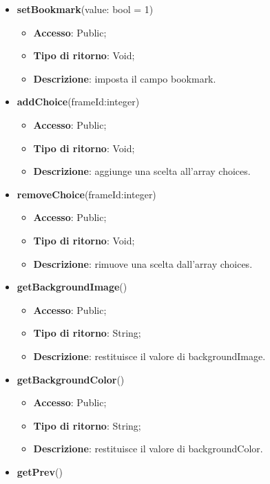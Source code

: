 {{\begin{itemize}
\begin{itemize}
				\item \textbf{Tipo di ritorno}: Bool;
				\item \textbf{Descrizione}: ritorna il valore del campo bookmark.
			\end{itemize}
			\item \textbf{setBookmark}(value: bool = 1)
			\begin{itemize}
				\item \textbf{Accesso}: Public;
				\item \textbf{Tipo di ritorno}: Void;
				\item \textbf{Descrizione}: imposta il campo bookmark.
			\end{itemize}
			\item \textbf{addChoice}(frameId:integer)
			\begin{itemize}
				\item \textbf{Accesso}: Public;
				\item \textbf{Tipo di ritorno}: Void;
				\item \textbf{Descrizione}: aggiunge una scelta all’array choices.
			\end{itemize}
			\item \textbf{removeChoice}(frameId:integer)
			\begin{itemize}
				\item \textbf{Accesso}: Public;
				\item \textbf{Tipo di ritorno}: Void;
				\item \textbf{Descrizione}: rimuove una scelta dall’array choices.
			\end{itemize}
			\item \textbf{getBackgroundImage}()
			\begin{itemize}
				\item \textbf{Accesso}: Public;
				\item \textbf{Tipo di ritorno}: String;
				\item \textbf{Descrizione}: restituisce il valore di backgroundImage.
			\end{itemize}
			\item \textbf{getBackgroundColor}()
			\begin{itemize}
				\item \textbf{Accesso}: Public;
				\item \textbf{Tipo di ritorno}: String;
				\item \textbf{Descrizione}: restituisce il valore di backgroundColor.
			\end{itemize}
			\item \textbf{getPrev}()

\end{itemize}}}
